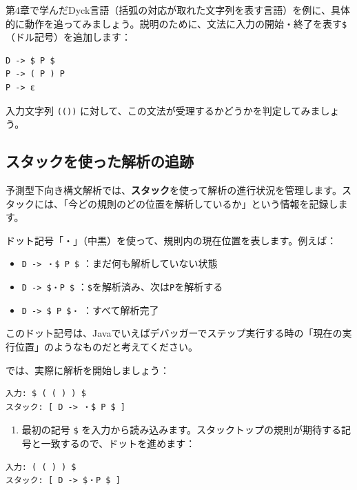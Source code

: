 第4章で学んだDyck言語（括弧の対応が取れた文字列を表す言語）を例に、具体的に動作を追ってみましょう。説明のために、文法に入力の開始・終了を表す\texttt{\$}（ドル記号）を追加します：

\begin{verbatim}
D -> $ P $
P -> ( P ) P
P -> ε
\end{verbatim}

入力文字列 \texttt{(())}
に対して、この文法が受理するかどうかを判定してみましょう。

\hypertarget{chapter5-ux30b9ux30bfux30c3ux30afux3092ux4f7fux3063ux305fux89e3ux6790ux306eux8ffdux8de1}{%
\subsection{スタックを使った解析の追跡}\label{chapter5-ux30b9ux30bfux30c3ux30afux3092ux4f7fux3063ux305fux89e3ux6790ux306eux8ffdux8de1}}

予測型下向き構文解析では、\textbf{スタック}を使って解析の進行状況を管理します。スタックには、「今どの規則のどの位置を解析しているか」という情報を記録します。

ドット記号「・」（中黒）を使って、規則内の現在位置を表します。例えば：

\begin{itemize}
\tightlist
\item
  \texttt{D\ -\textgreater{}\ ・\$\ P\ \$} ：まだ何も解析していない状態
\item
  \texttt{D\ -\textgreater{}\ \$・P\ \$}
  ：\texttt{\$}を解析済み、次は\texttt{P}を解析する
\item
  \texttt{D\ -\textgreater{}\ \$\ P\ \$・} ：すべて解析完了
\end{itemize}

このドット記号は、Javaでいえばデバッガーでステップ実行する時の「現在の実行位置」のようなものだと考えてください。

では、実際に解析を開始しましょう：

\begin{verbatim}
入力: $ ( ( ) ) $
スタック: [ D -> ・$ P $ ]
\end{verbatim}

\begin{enumerate}
\def\labelenumi{\arabic{enumi}.}
\tightlist
\item
  最初の記号 \texttt{\$}
  を入力から読み込みます。スタックトップの規則が期待する記号と一致するので、ドットを進めます：
\end{enumerate}

\begin{verbatim}
入力: ( ( ) ) $
スタック: [ D -> $・P $ ]
\end{verbatim}

